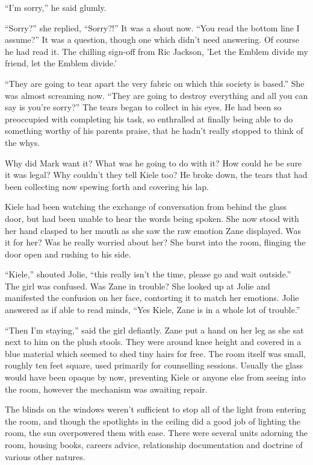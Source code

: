 ``I'm sorry,'' he said glumly.

``Sorry?'' she replied, ``Sorry?!'' It was a shout now.  ``You read the bottom line I assume?''  It was a question, though one which didn't need answering.  Of course he had read it.  The chilling sign-off from Ric Jackson, 'Let the Emblem divide my friend, let the Emblem divide.'

``They are going to tear apart the very fabric on which this society is based.''  She was almost screaming now.  ``They are going to destroy everything and all you can say is you're sorry?''  The tears began to collect in his eyes.  He had been so preoccupied with completing his task, so enthralled at finally being able to do something worthy of his parents praise, that he hadn't really stopped to think of the whys.

Why did Mark want it?  What was he going to do with it?  How could he be sure it was legal?  Why couldn't they tell Kiele too?  He broke down, the tears that had been collecting now spewing forth and covering his lap.  

Kiele had been watching the exchange of conversation from behind the glass door, but had been unable to hear the words being spoken.  She now stood with her hand clasped to her mouth as she saw the raw emotion Zane displayed.  Was it for her?  Was he really worried about her?  She burst into the room, flinging the door open and rushing to his side.

``Kiele,'' shouted Jolie, ``this really isn't the time, please go and wait outside.''  The girl was confused.  Was Zane in trouble?  She looked up at Jolie and manifested the confusion on her face, contorting it to match her emotions.  Jolie answered as if able to read minds, ``Yes Kiele, Zane is in a whole lot of trouble.''

``Then I'm staying,'' said the girl defiantly.  Zane put a hand on her leg as she sat next to him on the plush stools.  They were around knee height and covered in a blue material which seemed to shed tiny hairs for free.  The room itself was small, roughly ten feet square, used primarily for counselling sessions.  Usually the glass would have been opaque by now, preventing Kiele or anyone else from seeing into the room, however the mechanism was awaiting repair.

The blinds on the windows weren't sufficient to stop all of the light from entering the room, and though the spotlights in the ceiling did a good job of lighting the room, the sun overpowered them with ease.  There were several units adorning the room, housing books, careers advice, relationship documentation and doctrine of various other natures.

